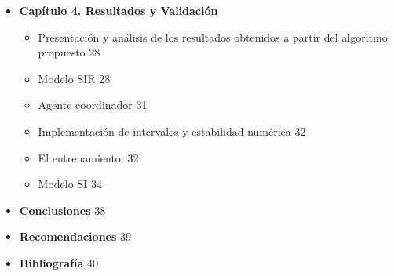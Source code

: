 \begin{itemize}
\item \textbf{ Capítulo 4. Resultados y Validación}
\begin{itemize}
    \item Presentación y análisis de los resultados obtenidos a partir del
    algoritmo propuesto \hfill 28
    \item Modelo SIR \hfill 28
    \item Agente coordinador \hfill 31
    \item Implementación de intervalos y estabilidad numérica \hfill 32
    \item El entrenamiento: \hfill 32
    \item Modelo SI \hfill 34
\end{itemize}

\item \textbf{ Conclusiones} \hfill 38
\item \textbf{ Recomendaciones} \hfill 39
\item \textbf{ Bibliografía} \hfill 40


\end{itemize}

\listoffigures
